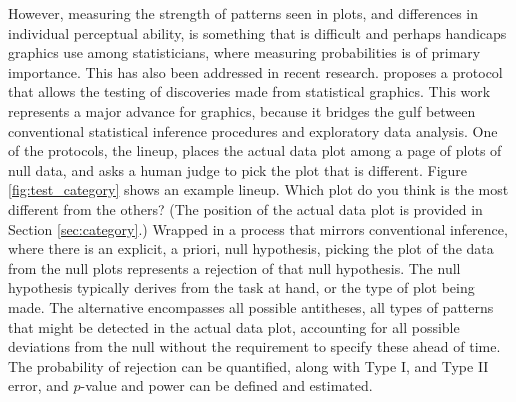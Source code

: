 \documentclass[12pt]{article}
\begin{document}
However, measuring the strength of patterns seen in plots, and differences in individual perceptual ability, is something that is difficult and perhaps handicaps graphics  use among statisticians, where measuring probabilities is of primary importance. This has also been addressed in recent research. \citet{buja:2009} proposes a protocol that allows the testing of discoveries made from statistical graphics. This work represents a major advance for graphics, because it bridges the gulf between conventional statistical inference procedures and exploratory data analysis. One of the protocols, the lineup, places the actual data plot among  a page of plots of null data, and asks a human judge to pick the plot that is different. Figure \ref{fig:test_category} shows an example lineup. Which plot do you think is the most different from the others? (The position of the actual data plot is provided in Section \ref{sec:category}.) Wrapped in a process that mirrors conventional inference, where there is an explicit, a priori, null hypothesis, picking the plot of the data from the null plots represents a rejection of that null hypothesis. The null hypothesis typically derives from the task at hand, or the type of plot being made. The alternative encompasses all possible antitheses, all types of patterns that might be detected in the actual data plot, accounting for all possible deviations from the null without the requirement to specify these ahead of time. The probability of rejection can be quantified, along with Type I, and Type II error, and $p$-value and power can be defined and estimated. 
\end{document}
